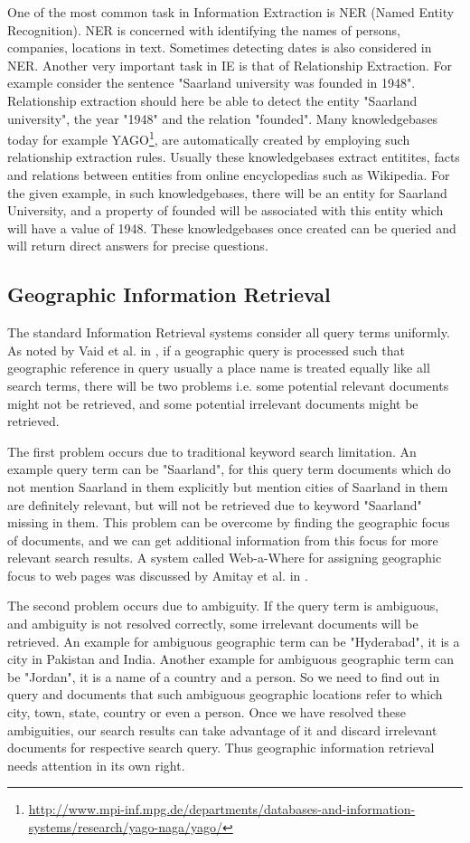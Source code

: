 \documentclass[
     11pt,         %
     a4paper,      %
     oneside,
     ]{article}
\begin{document}
One of the most common task in Information Extraction is NER (Named Entity Recognition). NER is concerned with identifying the names of persons, companies, locations in text. Sometimes detecting dates is also considered in NER. Another very important task in IE is that of Relationship Extraction. For example consider the sentence "Saarland university was founded in 1948". Relationship extraction should here be able to detect the entity "Saarland university", the year "1948" and the relation "founded". Many knowledgebases today for example YAGO\footnote{\url{http://www.mpi-inf.mpg.de/departments/databases-and-information-systems/research/yago-naga/yago/}}, are automatically created by employing such relationship extraction rules. Usually these knowledgebases extract entitites, facts and relations between entities from online encyclopedias such as Wikipedia. For the given example, in such knowledgebases, there will be an entity for Saarland University, and a property of founded will be associated with this entity which will have a value of 1948. These knowledgebases once created can be queried and will return direct answers for precise questions.
\subsection{Geographic Information Retrieval}
The standard Information Retrieval systems consider all query terms uniformly. As noted by Vaid et al. in \cite{Vaid:2005:SIG:2156226.2156244}, if a geographic query is processed such that geographic reference in query usually a place name is treated equally like all search terms, there will be two problems i.e. some potential relevant documents might not be retrieved, and some potential irrelevant documents might be retrieved. 

The first problem occurs due to traditional keyword search limitation. An example query term can be "Saarland", for this query term  documents which do not mention Saarland in them explicitly but mention cities of Saarland in them are definitely relevant, but will not be retrieved due to keyword "Saarland" missing in them. This problem can be overcome by finding the geographic focus of documents, and we can get additional information from this focus for more relevant search results. A system called Web-a-Where for assigning geographic focus to web pages was discussed by Amitay et al. in \cite{Amitay:2004:WGW:1008992.1009040}. 

The second problem occurs due to ambiguity. If the query term is ambiguous, and ambiguity is not resolved correctly, some irrelevant documents will be retrieved. An example for ambiguous geographic term can be "Hyderabad", it is a city in Pakistan and India. Another example for ambiguous geographic term can be "Jordan", it is a name of a country and a person. So we need to find out in query and documents that such ambiguous geographic locations refer to which city, town, state, country or even a person. Once we have resolved these ambiguities, our search results can take advantage of it and discard irrelevant documents for respective search query. Thus geographic information retrieval needs attention in its own right.  
\end{document}
